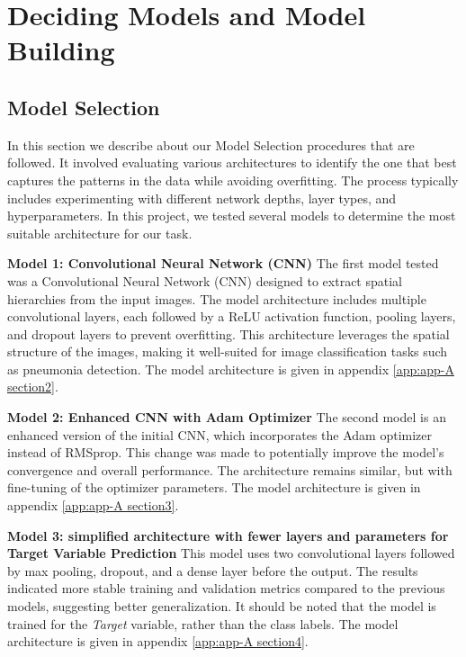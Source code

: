 \chapter{Deciding Models and Model Building}
\label{cha:chapter 3}

\section{Model Selection}
\label{sec:chap3 section 1}

In this section we describe about our Model Selection procedures that are followed. It involved evaluating various architectures to identify the one that best captures the patterns in the data while avoiding overfitting. The process typically includes experimenting with different network depths, layer types, and hyperparameters. In this project, we tested several models to determine the most suitable architecture for our task.

\textbf{Model 1: Convolutional Neural Network (CNN)}
The first model tested was a Convolutional Neural Network (CNN) designed to extract spatial hierarchies from the input images. The model architecture includes multiple convolutional layers, each followed by a ReLU activation function, pooling layers, and dropout layers to prevent overfitting. This architecture leverages the spatial structure of the images, making it well-suited for image classification tasks such as pneumonia detection. The model architecture is given in appendix \ref{app:app-A section2}.

\textbf{Model 2: Enhanced CNN with Adam Optimizer}
The second model is an enhanced version of the initial CNN, which incorporates the Adam optimizer instead of RMSprop. This change was made to potentially improve the model's convergence and overall performance. The architecture remains similar, but with fine-tuning of the optimizer parameters. The model architecture is given in appendix \ref{app:app-A section3}.

\textbf{Model 3:  simplified architecture with fewer layers and parameters for Target Variable Prediction}
This model uses two convolutional layers followed by max pooling, dropout, and a dense layer before the output. The results indicated more stable training and validation metrics compared to the previous models, suggesting better generalization. It should be noted that the model is trained for the \emph{Target} variable, rather than the class labels. The model architecture is given in appendix \ref{app:app-A section4}.

